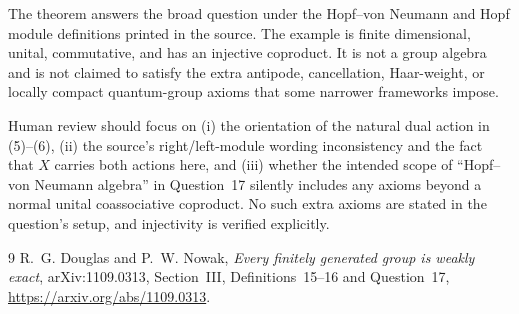 \documentclass[11pt]{article}
\newcommand{\1}{\mathbf 1}
\begin{document}
The theorem answers the broad question under the Hopf--von Neumann and Hopf
module definitions printed in the source.  The example is finite
dimensional, unital, commutative, and has an injective coproduct.  It is not a
group algebra and is not claimed to satisfy the extra antipode, cancellation,
Haar-weight, or locally compact quantum-group axioms that some narrower
frameworks impose.

Human review should focus on (i) the orientation of the natural dual action
in (5)--(6), (ii) the source's right/left-module wording inconsistency and
the fact that $X$ carries both actions here, and (iii) whether the intended
scope of ``Hopf--von Neumann algebra'' in Question~17 silently includes any
axioms beyond a normal unital coassociative coproduct.  No such extra axioms
are stated in the question's setup, and injectivity is verified explicitly.

\begin{thebibliography}{9}
R.~G. Douglas and P.~W. Nowak,
\emph{Every finitely generated group is weakly exact},
arXiv:1109.0313, Section~III, Definitions~15--16 and Question~17,
\url{https://arxiv.org/abs/1109.0313}.
\end{thebibliography}
\end{document}
